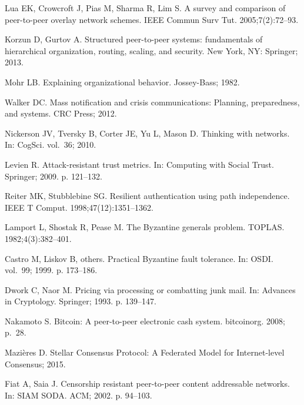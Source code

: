 \documentclass[10pt,letterpaper]{article}
\begin{document}
\begin{thebibliography}{10}
Lua EK, Crowcroft J, Pias M, Sharma R, Lim S.
\newblock A survey and comparison of peer-to-peer overlay network schemes.
\newblock IEEE Commun Surv Tut. 2005;7(2):72--93.

Korzun D, Gurtov A.
\newblock Structured peer-to-peer systems: fundamentals of hierarchical
  organization, routing, scaling, and security.
\newblock New York, NY: Springer; 2013.

Mohr LB.
\newblock Explaining organizational behavior.
\newblock Jossey-Bass; 1982.

Walker DC.
\newblock Mass notification and crisis communications: {Planning},
  preparedness, and systems.
\newblock CRC Press; 2012.

Nickerson JV, Tversky B, Corter JE, Yu L, Mason D.
\newblock Thinking with networks.
\newblock In: {CogSci}. vol.~36; 2010.

Levien R.
\newblock Attack-resistant trust metrics.
\newblock In: Computing with {Social} {Trust}. Springer; 2009. p. 121--132.

Reiter MK, Stubblebine SG.
\newblock Resilient authentication using path independence.
\newblock IEEE T Comput. 1998;47(12):1351--1362.

Lamport L, Shostak R, Pease M.
\newblock The {Byzantine} generals problem.
\newblock TOPLAS. 1982;4(3):382--401.

Castro M, Liskov B, {others}.
\newblock Practical {Byzantine} fault tolerance.
\newblock In: {OSDI}. vol.~99; 1999. p. 173--186.

Dwork C, Naor M.
\newblock Pricing via processing or combatting junk mail.
\newblock In: Advances in {Cryptology}. Springer; 1993. p. 139--147.

Nakamoto S.
\newblock Bitcoin: {A} peer-to-peer electronic cash system.
\newblock bitcoinorg. 2008; p.~28.

Mazières D.
\newblock Stellar {Consensus} {Protocol}: {A} {Federated} {Model} for
  {Internet}-level {Consensus}; 2015.

Fiat A, Saia J.
\newblock Censorship resistant peer-to-peer content addressable networks.
\newblock In: {SIAM} {SODA}. ACM; 2002. p. 94--103.


\end{thebibliography}
\end{document}
